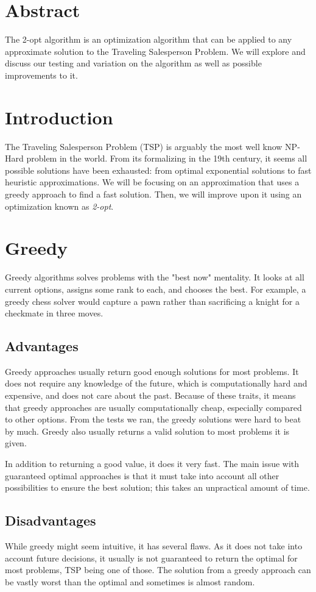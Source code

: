 \documentclass[12pt]{report}
\begin{document}
\begin{multicols}{2}

    \section*{Abstract}
    The 2-opt algorithm is an optimization algorithm that can be applied to any approximate solution to the Traveling Salesperson Problem. We will explore and discuss our testing and variation on the algorithm as well as possible improvements to it.
    \section{Introduction}
    The Traveling Salesperson Problem (TSP) is arguably the most well know NP-Hard problem in the world. From its formalizing in the 19th century, it seems all possible solutions have been exhausted: from optimal exponential solutions to fast heuristic approximations. We will be focusing on an approximation that uses a greedy approach to find a fast solution. Then, we will improve upon it using an optimization known as \textit{2-opt}.

    \section{Greedy}
    Greedy algorithms solves problems with the "best now" mentality. It looks at all current options, assigns some rank to each, and chooses the best. For example, a greedy chess solver would capture a pawn rather than sacrificing a knight for a checkmate in three moves.
    \subsection{Advantages}
    Greedy approaches usually return good enough solutions for most problems. It does not require any knowledge of the future, which is computationally hard and expensive, and does not care about the past. Because of these traits, it means that greedy approaches are usually computationally cheap, especially compared to other options. From the tests we ran, the greedy solutions were hard to beat by much. Greedy also usually returns a valid solution to most problems it is given.

    In addition to returning a good value, it does it very fast. The main issue with guaranteed optimal approaches is that it must take into account all other possibilities to ensure the best solution; this takes an unpractical amount of time.
    \subsection{Disadvantages}
    While greedy might seem intuitive, it has several flaws. As it does not take into account future decisions, it usually is not guaranteed to return the optimal for most problems, TSP being one of those. The solution from a greedy approach can be vastly worst than the optimal and sometimes is almost random.
\end{multicols}
\end{document}
